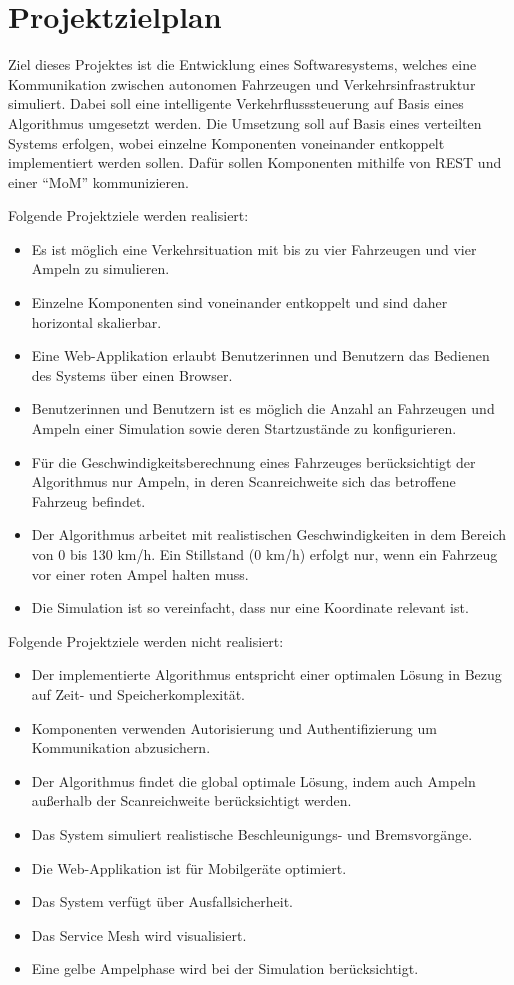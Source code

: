 \section{Projektzielplan}

Ziel dieses Projektes ist die Entwicklung eines Softwaresystems, welches eine Kommunikation zwischen autonomen Fahrzeugen und Verkehrsinfrastruktur simuliert.
Dabei soll eine intelligente Verkehrflusssteuerung auf Basis eines Algorithmus umgesetzt werden.
Die Umsetzung soll auf Basis eines verteilten Systems erfolgen, wobei einzelne Komponenten voneinander entkoppelt implementiert werden sollen.
Dafür sollen Komponenten mithilfe von REST und einer \enquote{MoM} kommunizieren.

Folgende Projektziele werden realisiert:

\begin{itemize}
  \item Es ist möglich eine Verkehrsituation mit bis zu vier Fahrzeugen und vier Ampeln zu simulieren.
  \item Einzelne Komponenten sind voneinander entkoppelt und sind daher horizontal skalierbar.
  \item Eine Web-Applikation erlaubt Benutzerinnen und Benutzern das Bedienen des Systems über einen Browser.
  \item Benutzerinnen und Benutzern ist es möglich die Anzahl an Fahrzeugen und Ampeln einer Simulation sowie deren Startzustände zu konfigurieren.
  \item Für die Geschwindigkeitsberechnung eines Fahrzeuges berücksichtigt der Algorithmus nur Ampeln, in deren Scanreichweite sich das betroffene Fahrzeug befindet.
  \item Der Algorithmus arbeitet mit realistischen Geschwindigkeiten in dem Bereich von 0 bis 130 km/h. Ein Stillstand (0 km/h) erfolgt nur, wenn ein Fahrzeug vor einer roten Ampel halten muss.
  \item Die Simulation ist so vereinfacht, dass nur eine Koordinate relevant ist.
\end{itemize}

Folgende Projektziele werden nicht realisiert:

\begin{itemize}
  \item Der implementierte Algorithmus entspricht einer optimalen Lösung in Bezug auf Zeit- und Speicherkomplexität.
  \item Komponenten verwenden Autorisierung und Authentifizierung um Kommunikation abzusichern.
  \item Der Algorithmus findet die global optimale Lösung, indem auch Ampeln außerhalb der Scanreichweite berücksichtigt werden.
  \item Das System simuliert realistische Beschleunigungs- und Bremsvorgänge.
  \item Die Web-Applikation ist für Mobilgeräte optimiert.
  \item Das System verfügt über Ausfallsicherheit.
  \item Das Service Mesh wird visualisiert.
  \item Eine gelbe Ampelphase wird bei der Simulation berücksichtigt.
\end{itemize}
